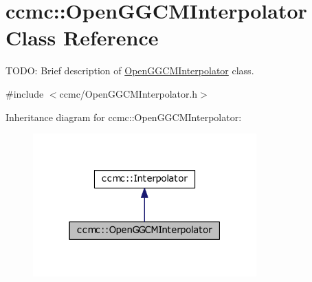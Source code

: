 \hypertarget{classccmc_1_1_open_g_g_c_m_interpolator}{\section{ccmc\-:\-:Open\-G\-G\-C\-M\-Interpolator Class Reference}
\label{classccmc_1_1_open_g_g_c_m_interpolator}
}


T\-O\-D\-O\-: Brief description of \hyperlink{classccmc_1_1_open_g_g_c_m_interpolator}{Open\-G\-G\-C\-M\-Interpolator} class.  




{\ttfamily \#include $<$ccmc/\-Open\-G\-G\-C\-M\-Interpolator.\-h$>$}



Inheritance diagram for ccmc\-:\-:Open\-G\-G\-C\-M\-Interpolator\-:\nopagebreak
\begin{figure}[H]
\begin{center}
\leavevmode
\includegraphics[width=244pt]{classccmc_1_1_open_g_g_c_m_interpolator__inherit__graph}
\end{center}
\end{figure}


